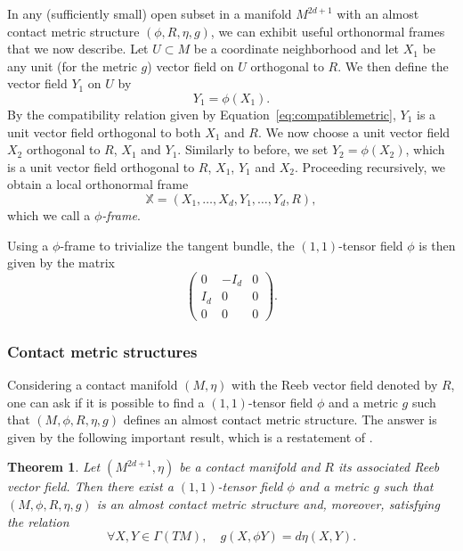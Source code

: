 \documentclass[12pt,a4paper]{amsart}
\theoremstyle{plain}
\newtheorem{theorem}{Theorem}[section]
\theoremstyle{definition}
\theoremstyle{remark}
\numberwithin{equation}{section}
\theoremstyle{definition}
\def \bX{\mathbb{X}}
\numberwithin{equation}{section}
\begin{document}
In any (sufficiently small) open subset in a manifold $M^{2d+1}$ with an almost contact metric structure $(\phi,R,\eta,g)$, we can
exhibit useful orthonormal frames that we now describe. Let $U\subset M$ be a coordinate neighborhood and let $X_1$ be any unit (for the metric $g$) vector field on $U$
orthogonal to $R$. We then define the vector field $Y_1$ on $U$ by 
\begin{equation*}
 Y_1 = \phi (X_1).
\end{equation*}
By the compatibility relation given by Equation~\eqref{eq:compatiblemetric}, $Y_1$ is a unit vector field orthogonal to both $X_1$ and $R$.
We now choose a unit vector field $X_2$ orthogonal to $R$, $X_1$ and $Y_1$. Similarly to before, we set $Y_2 = \phi (X_2)$, which is a unit vector field orthogonal to $R$, $X_1$, $Y_1$ and $X_2$. Proceeding recursively, we obtain a local orthonormal frame 
\begin{equation*}
 \bX = (X_1,\dots,X_d,Y_1,\dots,Y_d,R),
\end{equation*}
which we call a \emph{$\phi$-frame}.

Using a $\phi$-frame to trivialize the tangent bundle, the $(1,1)$-tensor field $\phi$ is then given by the matrix 
\begin{equation*}
 \begin{pmatrix}
 0 & -I_d & 0\\
 I_d & 0 & 0\\
 0 & 0 & 0
 \end{pmatrix}.
\end{equation*}


\subsubsection{Contact metric structures}

Considering a contact manifold $(M,\eta)$ with the Reeb vector field denoted by $R$, one can ask if it is possible to find a $(1,1)$-tensor field $\phi$ and a metric $g$ such that $(M,\phi,R,\eta,g)$ defines an almost contact metric structure. The answer is given by the following important result, which is a restatement of \cite[Theorem 4.4]{Blair}.

\begin{theorem}
 \label{thm:existencecontactmetric}
 Let $(M^{2d+1},\eta)$ be a contact manifold and $R$ its associated Reeb vector field. Then there exist a $(1,1)$-tensor field $\phi$ and a metric $g$ 
 such that $(M,\phi,R,\eta,g)$ is an almost contact metric structure and, moreover, satisfying  the relation 
 \begin{equation*}
 \forall X,Y \in \Gamma(TM),\quad g(X,\phi Y) = d\eta(X,Y).
 \end{equation*}
\end{theorem}
\end{document}
